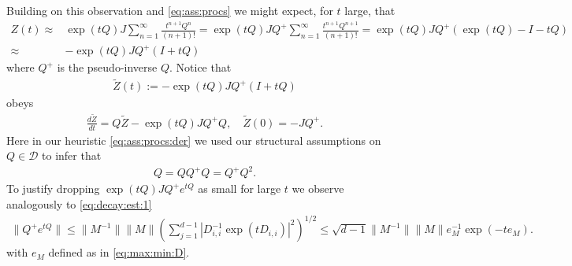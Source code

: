 \documentclass[twoside]{article}
\numberwithin{equation}{section}
\begin{document}
Building on this observation and \eqref{eq:ass:procs} we might expect, for $t$ large, that
\begin{align}
	Z(t) \approx& \exp(t Q) J  \sum_{n = 1}^\infty \frac{t^{n+1}Q^n}{(n+1)!}  
	= \exp(t Q) J Q^+  \sum_{n = 1}^\infty \frac{t^{n+1}Q^{n+1}}{(n+1)!}  
	= \exp(t Q) J Q^+  (\exp(tQ) - I - t Q)\\
	\approx& -\exp(t Q) J Q^+  ( I + t Q)
	\label{eq:ass:procs:der}
\end{align}
where $Q^+$ is the pseudo-inverse $Q$. 
Notice that
\begin{align}
 \tilde{Z}(t) := -\exp(t Q) J Q^+  ( I + t Q)
 \label{eq:t:ass:diff}
\end{align}
obeys 
\begin{align}
\label{eq:tZ:dym}
	\frac{d \tilde{Z}}{dt} = Q \tilde{Z} -\exp(t Q) J Q^+Q, \quad \tilde{Z}(0) =- J Q^+.
\end{align}
Here in our heuristic \eqref{eq:ass:procs:der} we used our structural assumptions on $Q \in \mathcal{D}$ 
to infer that 
\begin{align*}
Q = Q Q^+ Q = Q^+ Q^2.
\end{align*}
To justify dropping $\exp(t Q) J Q^+ e^{tQ}$
as small for large $t$ we observe analogously to \eqref{eq:decay:est:1}
\begin{align}
	\| Q^+ e^{tQ} \| \leq  \| M^{-1}\| \|M\| \left( \sum_{j =1}^{d-1} | D_{i,i}^{-1} \exp( t D_{i,i}) |^2 \right)^{1/2}
	\leq  \sqrt{d-1}\| M^{-1}\| \|M\| e_M^{-1} \exp(-t e_M).
	\label{eq:decay:est:2}
\end{align}
with $e_M$ defined as in \eqref{eq:max:min:D}.
\end{document}

